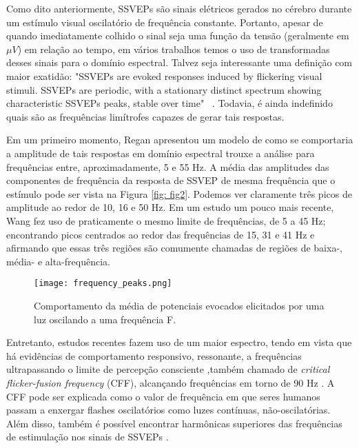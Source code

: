 Como dito anteriormente, SSVEPs são sinais elétricos gerados no cérebro durante um estímulo visual oscilatório de frequência constante. Portanto, apesar de quando imediatamente colhido o sinal seja uma função da tensão (geralmente em $\mu V$) em relação ao tempo, em vários trabalhos temos o uso de transformadas desses sinais para o domínio espectral. Talvez seja interessante uma definição com maior exatidão: "SSVEPs are evoked responses induced by flickering visual stimuli. SSVEPs are periodic, with a stationary distinct spectrum showing characteristic SSVEPs peaks, stable over time" ~\cite{Vialatte2010}. Todavia, é ainda indefinido quais são as frequências limítrofes capazes de gerar tais respostas. 

Em um primeiro momento, Regan \cite{Regan1982} apresentou um modelo de como se comportaria a amplitude de tais respostas em domínio espectral trouxe a análise para frequências entre, aproximadamente, 5 e 55 Hz. A média das amplitudes das componentes de frequência da resposta de SSVEP de mesma frequência que o estímulo pode ser vista na Figura \autoref{fig: fig2}. Podemos ver claramente três picos de amplitude ao redor de 10, 16 e 50 Hz. Em um estudo um pouco mais recente, Wang \cite{Wang2006} fez uso de praticamente o mesmo limite de frequências, de 5 a 45 Hz; encontrando picos centrados ao redor das frequências de 15, 31 e 41 Hz e afirmando que essas três regiões são comumente chamadas de regiões de baixa-, média- e alta-frequência.

\begin{figure}[ht]
    \caption{Comportamento da média de potenciais evocados elicitados por uma luz oscilando a uma frequência F.}
    \label{fig: fig2}
    \centering
    \texttt{[image: frequency\_peaks.png]}
\end{figure}

Entretanto, estudos recentes fazem uso de um maior espectro, tendo em vista que há evidências de comportamento responsivo, ressonante, a frequências ultrapassando o limite de percepção consciente ,também chamado de \textit{critical flicker-fusion frequency} (CFF), alcançando frequências em torno de 90 Hz \cite{Pastor2003, Herrmann2001, RamosJunior2011}. A CFF pode ser explicada como o valor de frequência em que seres humanos passam a enxergar flashes oscilatórios como luzes contínuas, não-oscilatórias. Além disso, também é possível encontrar harmônicas superiores das frequências de estimulação nos sinais de SSVEPs \cite{Muller2005a}.

